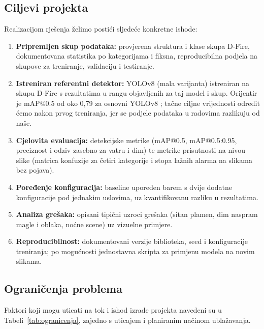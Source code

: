 \subsection{Ciljevi projekta}
Realizacijom rješenja želimo postići sljedeće konkretne ishode:
\begin{enumerate}
  \item \textbf{Pripremljen skup podataka:} provjerena struktura i klase skupa D-Fire, dokumentovana statistika po kategorijama i fiksna, reproducibilna podjela na skupove za treniranje, validaciju i testiranje.
  \item \textbf{Istreniran referentni detektor:} YOLOv8 (mala varijanta) istreniran na skupu D-Fire s rezultatima u rangu objavljenih za taj model i skup. Orijentir je mAP@0.5 od oko 0,79 za osnovni YOLOv8 \cite{liyologx}; tačne ciljne vrijednosti odredit ćemo nakon prvog treniranja, jer se podjele podataka u radovima razlikuju od naše.
  \item \textbf{Cjelovita evaluacija:} detekcijske metrike (mAP@0.5, mAP@0.5:0.95, preciznost i odziv zasebno za vatru i dim) te metrike prisutnosti na nivou slike (matrica konfuzije za četiri kategorije i stopa lažnih alarma na slikama bez pojava).
  \item \textbf{Poređenje konfiguracija:} baseline uporeden barem s dvije dodatne konfiguracije pod jednakim uslovima, uz kvantifikovanu razliku u rezultatima.
  \item \textbf{Analiza grešaka:} opisani tipični uzroci grešaka (sitan plamen, dim naspram magle i oblaka, noćne scene) uz vizuelne primjere.
  \item \textbf{Reproducibilnost:} dokumentovani verzije biblioteka, seed i konfiguracije treniranja; po mogućnosti jednostavna skripta za primjenu modela na novim slikama.
\end{enumerate}

\subsection{Ograničenja problema}
Faktori koji mogu uticati na tok i ishod izrade projekta navedeni su u Tabeli~\ref{tab:ogranicenja}, zajedno s uticajem i planiranim načinom ublažavanja.

